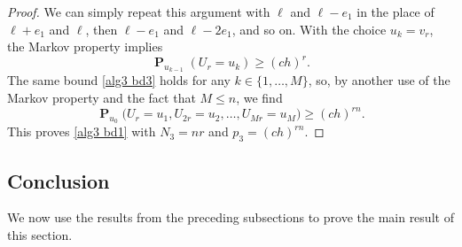 \documentclass[11pt,reqno]{amsart}
\theoremstyle{definition}
\numberwithin{equation}{section}
\newcommand{\1}{\mathbf{1}}
\DeclareMathOperator{\PP}{\mathbf{P}}
\begin{document}
\begin{proof}
We can simply repeat this argument with $\ell$ and $\ell-e_1$ in the place of $\ell+e_1$ and $\ell$, then $\ell-e_1$ and $\ell-2e_1$, and so on. With the choice $u_k = v_r$, the Markov property implies
\begin{equation}\label{alg3 bd3}
\PP_{u_{k-1}} (U_{r} = u_k) \geq (ch)^{r}.
\end{equation}
The same bound \eqref{alg3 bd3} holds for any $k \in \{1, \dots, M\}$, so, by another use of the Markov property and the fact that $M \leq n$, we find
\begin{equation}%
\PP_{u_0} \big( U_{r} = u_1, U_{2r} = u_2, \dots, U_{Mr} = u_M \big) \geq (ch)^{rn}.
\end{equation}
This proves \eqref{alg3 bd1} with $N_3 = nr$ and $p_3 = (ch)^{rn}$.
\end{proof}


\subsection{Conclusion}\label{sec 14 conc}

We now use the results from the preceding subsections to prove the main result of this section.
\end{document}
